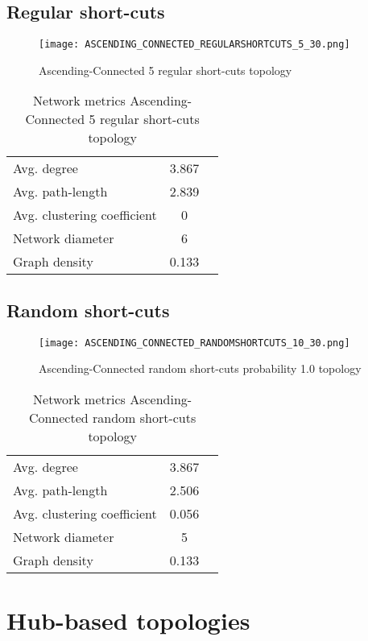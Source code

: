 \documentclass[Bachelorarbeit.tex]{subfiles}
\begin{document}
\subsection{Regular short-cuts}
\begin{figure}[H]
	\centering
  \texttt{[image: ASCENDING\_CONNECTED\_REGULARSHORTCUTS\_5\_30.png]}
	\caption{Ascending-Connected 5 regular short-cuts topology}
	\label{fig1}
\end{figure}

\begin{table}[h]
	\centering
	\caption{Network metrics Ascending-Connected 5 regular short-cuts topology}
	\begin{tabular} { l c r }
		\hline
		Avg. degree & 3.867 \\
		Avg. path-length & 2.839 \\
		Avg. clustering coefficient & 0 \\
		Network diameter & 6 \\
		Graph density & 0.133\\
		\hline
	\end{tabular}
\end{table}

\subsection{Random short-cuts}
\begin{figure}[H]
	\centering
  \texttt{[image: ASCENDING\_CONNECTED\_RANDOMSHORTCUTS\_10\_30.png]}
	\caption{Ascending-Connected random short-cuts probability 1.0 topology}
	\label{fig1}
\end{figure}

\begin{table}[h]
	\centering
	\caption{Network metrics Ascending-Connected random short-cuts topology}
	\begin{tabular} { l c r }
		\hline
		Avg. degree & 3.867 \\
		Avg. path-length & 2.506 \\
		Avg. clustering coefficient & 0.056 \\
		Network diameter & 5 \\
		Graph density & 0.133\\
		\hline
	\end{tabular}
\end{table}

\section{Hub-based topologies}
\end{document}
